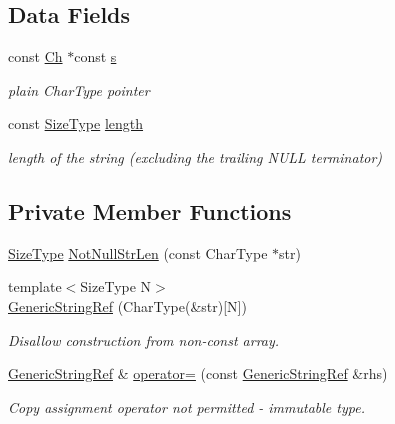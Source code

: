 \subsection*{Data Fields}
\begin{DoxyCompactItemize}
\item 
const \mbox{\hyperlink{structrapidjson_1_1_generic_string_ref_aa2a8eccae3d7eb14c30bc21afb7d6fba}{Ch}} $\ast$const \mbox{\hyperlink{structrapidjson_1_1_generic_string_ref_a001276ee57cbcbd3c14449045c71e994}{s}}
\begin{DoxyCompactList}\small\item\em plain Char\+Type pointer \end{DoxyCompactList}\item 
const \mbox{\hyperlink{namespacerapidjson_a44eb33eaa523e36d466b1ced64b85c84}{Size\+Type}} \mbox{\hyperlink{structrapidjson_1_1_generic_string_ref_ae223535ec20edf0c1db44a40b7735111}{length}}
\begin{DoxyCompactList}\small\item\em length of the string (excluding the trailing N\+U\+LL terminator) \end{DoxyCompactList}\end{DoxyCompactItemize}
\subsection*{Private Member Functions}
\begin{DoxyCompactItemize}
\item 
\mbox{\hyperlink{namespacerapidjson_a44eb33eaa523e36d466b1ced64b85c84}{Size\+Type}} \mbox{\hyperlink{structrapidjson_1_1_generic_string_ref_a256d24bd0bf99047c025c12d8ec2e10f}{Not\+Null\+Str\+Len}} (const Char\+Type $\ast$str)
\item 
{\footnotesize template$<$Size\+Type N$>$ }\\\mbox{\hyperlink{structrapidjson_1_1_generic_string_ref_aba75f7e5e1d6698d60a88d1331e2d2ba}{Generic\+String\+Ref}} (Char\+Type(\&str)\mbox{[}N\mbox{]})
\begin{DoxyCompactList}\small\item\em Disallow construction from non-\/const array. \end{DoxyCompactList}\item 
\mbox{\hyperlink{structrapidjson_1_1_generic_string_ref}{Generic\+String\+Ref}} \& \mbox{\hyperlink{structrapidjson_1_1_generic_string_ref_a54f516a5ada5bba4a8cfca18d779fa45}{operator=}} (const \mbox{\hyperlink{structrapidjson_1_1_generic_string_ref}{Generic\+String\+Ref}} \&rhs)
\begin{DoxyCompactList}\small\item\em Copy assignment operator not permitted -\/ immutable type. \end{DoxyCompactList}\end{DoxyCompactItemize}
